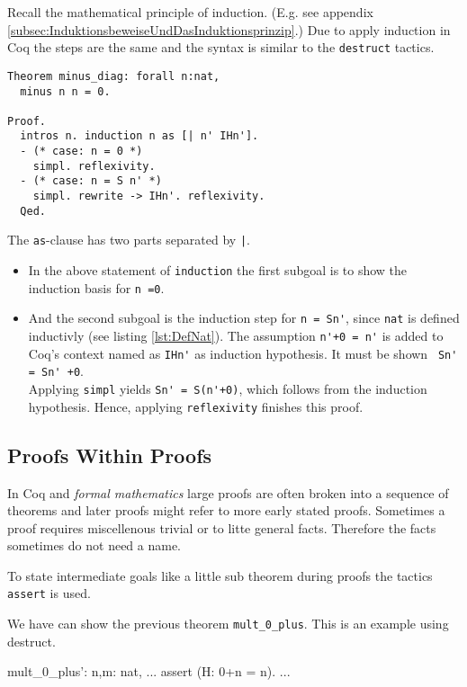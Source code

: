 Recall the mathematical principle of induction. (E.g. see appendix \ref{subsec:InduktionsbeweiseUndDasInduktionsprinzip}.)
Due to apply induction in Coq the steps are the same and the syntax is similar to the \lstinline!destruct! tactics.
 

\begin{lstlisting}[caption = \lstinline!minus_diag!, label =lst:minus_diag] 
Theorem minus_diag: forall n:nat,
  minus n n = 0.
  
Proof.
  intros n. induction n as [| n' IHn'].
  - (* case: n = 0 *)
    simpl. reflexivity.
  - (* case: n = S n' *)
    simpl. rewrite -> IHn'. reflexivity.  
  Qed.
\end{lstlisting}

The \lstinline!as!-clause has two parts separated by \lstinline!|!.
\begin{itemize}
	\item In the above statement of \lstinline!induction! the first subgoal is to show the induction basis for \lstinline!n =0!.
	\item And the second subgoal is the induction step for \lstinline!n = Sn'!, since \lstinline!nat! is defined inductivly (see listing  \ref{lst:DefNat}).
	      The assumption \lstinline!n'+0 = n'! is added to Coq's context named as \lstinline!IHn'! as induction hypothesis.
		  It must be shown \lstinline! Sn' = Sn' +0!. \\
          Applying \lstinline!simpl! yields \lstinline!Sn' = S(n'+0)!, which follows from the induction hypothesis. 
          Hence, applying \lstinline!reflexivity! finishes this proof.
\end{itemize} 

\subsection{Proofs Within Proofs}

In Coq and {\itshape formal mathematics} large proofs are often broken into a sequence of theorems and later proofs might refer to more early stated proofs.
Sometimes a proof requires miscellenous trivial or to litte general facts. 
Therefore the facts sometimes do not need a name.

To state intermediate goals like a little sub theorem during proofs the tactics \lstinline!assert! is used.


\begin{example}
We have can show the previous theorem \lstinline!mult_0_plus!. This is an example using destruct. 

\begin{lstinline}
	mult_0_plus': \forall n,m: nat,
	...
	assert (H: 0+n = n).
	...
\end{lstinline}

\end{example}


